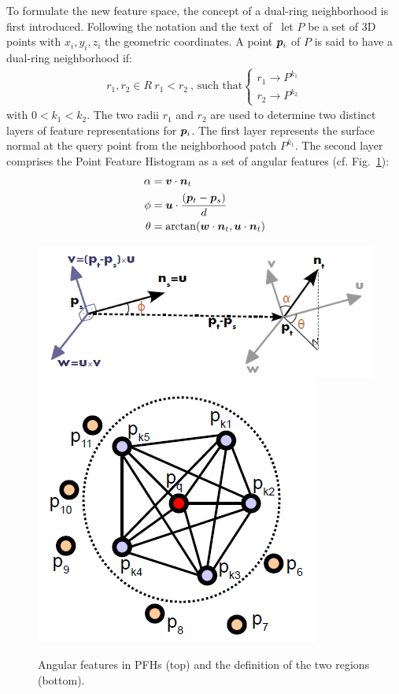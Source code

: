 \documentclass[twocolumn,oneside]{book}
\newcommand{\V}[1]{\vector{#1}}  %
\begin{document}
\begin{itemize}
  To formulate the new feature space, the concept of a dual-ring
  neighborhood is first introduced.  Following the notation and the
  text of~\cite{RaduPhD} let $P$ be a set of 3D points with $x_i, y_i,
  z_i$ the geometric coordinates. A point $\V p_i$ of $P$ is said to
  have a dual-ring neighborhood if:
  \begin{align*}
  r_1, r_2 \in R \ r_1 < r_2 \
  \text{, such that}
  \left\{
  \begin{array}{l}
    r_1 \to P^{k_1}\\
    r_2 \to P^{k_2}
  \end{array}
  \right.
  \end{align*}
  with $0 < k_1 < k_2$. The two radii $r_1$ and $r_2$ are used to
  determine two distinct layers of feature representations for $\V
  p_i$. The first layer represents the surface normal at the query
  point from the neighborhood patch $P^{k_1}$. The second layer
  comprises the Point Feature Histogram as a set of angular features
  (cf. Fig.~\ref{fig:angular_feature}):
  \begin{align*}
    \alpha & = \V v \cdot \V n_t \\
    \phi   & = \V u \cdot \frac{(\V p_t - \V p_s)}{d}\\
    \theta & = \arctan(\V w \cdot \V n_t, \V u \cdot \V n_t)
  \end{align*}
  \begin{figure}
    \centering
    \includegraphics[width=0.85\linewidth]{BOOKFIGS/angular_feature}
    \includegraphics[width=0.6\linewidth]{BOOKFIGS/pfh}
    \caption{Angular features in PFHs (top) and the definition of the
      two regions (bottom).}\label{fig:angular_feature}
  \end{figure}  


\end{itemize}
\end{document}
